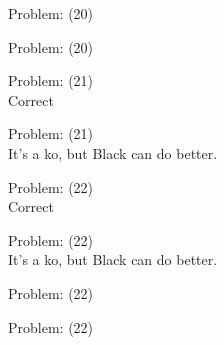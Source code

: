 \documentclass[11pt]{article}
\begin{document}
\begin{minipage}[t]{0.5\textwidth}
  {\centering
  
Problem: (20)\\
  }
\end{minipage}
\begin{minipage}[t]{0.5\textwidth}
  {\centering
  
Problem: (20)\\
  }
\end{minipage}
\begin{minipage}[t]{0.5\textwidth}
  {\centering
  
Problem: (21)\\
Correct\\
  }
\end{minipage}
\begin{minipage}[t]{0.5\textwidth}
  {\centering
  
Problem: (21)\\
It's a ko, but Black can do better.\\
  }
\end{minipage}
\begin{minipage}[t]{0.5\textwidth}
  {\centering
  
Problem: (22)\\
Correct\\
  }
\end{minipage}
\begin{minipage}[t]{0.5\textwidth}
  {\centering
  
Problem: (22)\\
It's a ko, but Black can do better.\\
  }
\end{minipage}
\begin{minipage}[t]{0.5\textwidth}
  {\centering
  
Problem: (22)\\
  }
\end{minipage}
\begin{minipage}[t]{0.5\textwidth}
  {\centering
  
Problem: (22)\\
  }
\end{minipage}
\end{document}
